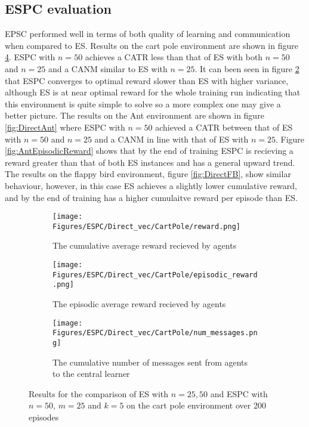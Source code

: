 \subsection{ESPC evaluation}
\label{sec:ESPCDirect}
EPSC performed well in terms of both quality of learning and communication when compared to ES. Results on the cart pole environment are shown in figure \ref{fig:DirectCP}. ESPC with $n=50$ achieves a CATR less than that of ES with both $n=50$ and $n=25$ and a CANM similar to ES with $n=25$. It can been seen in figure \ref{fig:CPEpisodicReward} that ESPC converges to optimal reward slower than ES with higher variance, although ES is at near optimal reward for the whole training run indicating that this environment is quite simple to solve so a more complex one may give a better picture. The results on the Ant environment are shown in figure \ref{fig:DirectAnt} where ESPC with $n=50$ achieved a CATR between that of ES with $n=50$ and $n=25$ and a CANM in line with that of ES with $n=25$. Figure \ref{fig:AntEpisodicReward} shows that by the end of training ESPC is recieving a reward greater than that of both ES instances and has a general upward trend. The results on the flappy bird environment, figure \ref{fig:DirectFB}, show similar behaviour, however, in this case ES achieves a slightly lower cumulative reward, and by the end of training has a higher cumulaitve reward per episode than ES.
\begin{figure}
    \centering
    \begin{subfigure}{0.5\textwidth}
        \centering
        \texttt{[image: Figures/ESPC/Direct\_vec/CartPole/reward.png]}
        \caption{The cumulative average reward recieved by agents}
        \label{fig:CPReward}
    \end{subfigure}
    \begin{subfigure}{0.5\textwidth}
        \centering
        \texttt{[image: Figures/ESPC/Direct\_vec/CartPole/episodic\_reward.png]}
        \caption{The episodic average reward recieved by agents}
        \label{fig:CPEpisodicReward}
    \end{subfigure}
    \begin{subfigure}{0.5\textwidth}
        \centering
        \texttt{[image: Figures/ESPC/Direct\_vec/CartPole/num\_messages.png]}
        \caption{The cumulative number of messages sent from agents to the central learner}
        \label{fig:CPMessages}
    \end{subfigure}
    \caption{Results for the comparison of ES with $n=25,50$ and ESPC with $n=50$, $m=25$ and $k=5$ on the cart pole environment over 200 episodes}
    \label{fig:DirectCP}
\end{figure}

